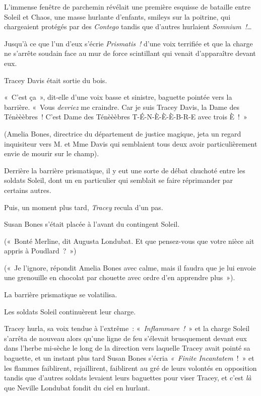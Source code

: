 \later

L'immense fenêtre de parchemin révélait une première esquisse de bataille entre Soleil et Chaos, une masse hurlante d'enfants, smileys sur la poitrine, qui chargeaient protégés par des \emph{Contego} tandis que d'autres hurlaient \emph{Somnium~!}…

Jusqu'à ce que l'un d'eux s'écrie \emph{Prismatis~!} d'une voix terrifiée et que la charge ne s'arrête soudain face au mur de force scintillant qui venait d'apparaître devant eux.

Tracey Davis était sortie du bois.

«~C'est ça~», dit-elle d'une voix basse et sinistre, baguette pointée vers la barrière. «~Vous \emph{devriez} me craindre. Car je suis Tracey Davis, la Dame des Ténèèèbres~! C'est Dame des Ténèèèbres T-É-N-È-È-È-B-R-E avec trois È~!~»

(Amelia Bones, directrice du département de justice magique, jeta un regard inquisiteur vers M. et Mme Davis qui semblaient tous deux avoir particulièrement envie de mourir sur le champ).

Derrière la barrière prismatique, il y eut une sorte de débat chuchoté entre les soldats Soleil, dont un en particulier qui semblait se faire réprimander par certains autres.

Puis, un moment plus tard, \emph{Tracey} recula d'un pas.

Susan Bones s'était placée à l'avant du contingent Soleil.

(«~Bonté Merline, dit Augusta Londubat. Et que pensez-vous que votre nièce ait appris à Poudlard~?~»)

(«~Je l'ignore, répondit Amelia Bones avec calme, mais il faudra que je lui envoie une grenouille en chocolat par chouette avec ordre d'en apprendre plus~»).

La barrière prismatique se volatilisa.

Les soldats Soleil continuèrent leur charge.

Tracey hurla, sa voix tendue à l'extrême~: «~\emph{Inflammare~!}~» et la charge Soleil s'arrêta de nouveau alors qu'une ligne de feu s'élevait brusquement devant eux dans l'herbe mi-sèche le long de la direction vers laquelle Tracey avait pointé sa baguette, et un instant plus tard Susan Bones s'écria \emph{«~Finite Incantatem}~!~» et les flammes faiblirent, rejaillirent, faiblirent au gré de leurs volontés en opposition tandis que d'autres soldats levaient leurs baguettes pour viser Tracey, et c'est \emph{là} que Neville Londubat fondit du ciel en hurlant.

